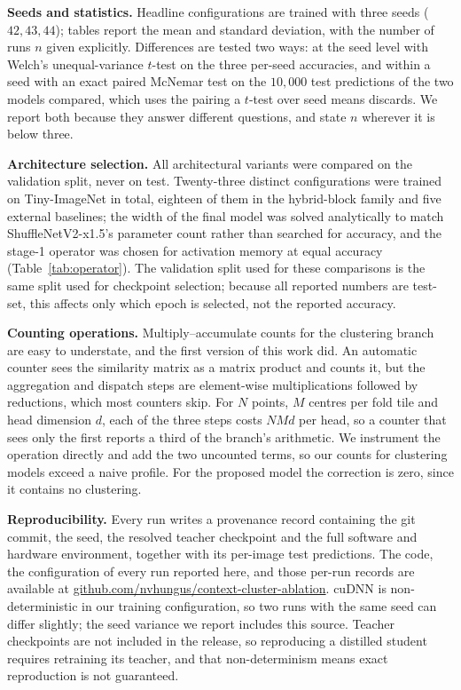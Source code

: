 \textbf{Seeds and statistics.} Headline configurations are trained with three
seeds ($42, 43, 44$); tables report the mean and standard deviation, with the
number of runs $n$ given explicitly. Differences are tested two ways: at the
seed level with Welch's unequal-variance $t$-test on the three per-seed
accuracies, and within a seed with an exact paired McNemar test
\cite{mcnemar} on the $10{,}000$ test predictions of the two models compared,
which uses the pairing a $t$-test over seed means discards. We report both
because they answer different questions, and state $n$ wherever it is below
three.

\textbf{Architecture selection.} All architectural variants were compared on
the validation split, never on test. Twenty-three distinct configurations were
trained on Tiny-ImageNet in total, eighteen of them in the hybrid-block family
and five external baselines; the width of the final model was solved
analytically to match ShuffleNetV2-x1.5's parameter count rather than searched
for accuracy, and the stage-1 operator was chosen for activation memory at
equal accuracy (Table~\ref{tab:operator}). The validation split used for these
comparisons is the same split used for checkpoint selection; because all
reported numbers are test-set, this affects only which epoch is selected, not
the reported accuracy.

\textbf{Counting operations.} Multiply--accumulate counts for the clustering
branch are easy to understate, and the first version of this work did. An
automatic counter sees the similarity matrix as a matrix product and counts
it, but the aggregation and dispatch steps are element-wise multiplications
followed by reductions, which most counters skip. For $N$ points, $M$ centres
per fold tile and head dimension $d$, each of the three steps costs $NMd$ per
head, so a counter that sees only the first reports a third of the branch's
arithmetic. We instrument the operation directly and add the two uncounted
terms, so our counts for clustering models exceed a naive profile. For the
proposed model the correction is zero, since it contains no clustering.

\textbf{Reproducibility.} Every run writes a provenance record containing the
git commit, the seed, the resolved teacher checkpoint and the full software
and hardware environment, together with its per-image test predictions. The
code, the configuration of every run reported here, and those per-run records
are available at \mbox{\url{github.com/nvhungus/context-cluster-ablation}}.
cuDNN is non-deterministic in our training configuration, so two runs with the
same seed can differ slightly; the seed variance we report includes this
source. Teacher checkpoints are not included in the release, so reproducing a
distilled student requires retraining its teacher, and that non-determinism
means exact reproduction is not guaranteed.

